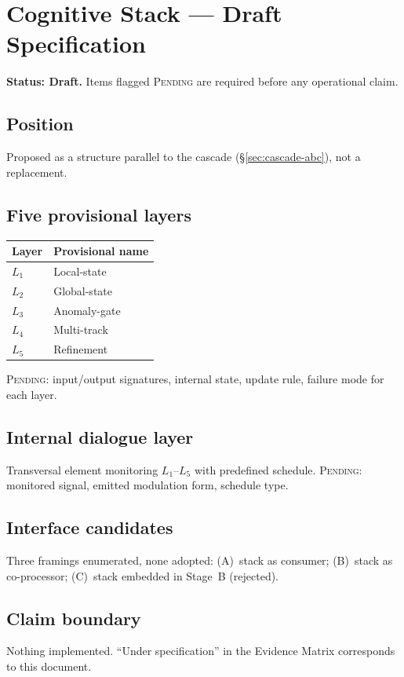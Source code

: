 \section{Cognitive Stack --- Draft Specification}
\label{sec:cognitive-stack-draft}

\noindent\textbf{Status: Draft.} Items flagged \textsc{Pending} are required
before any operational claim.

\subsection{Position}

Proposed as a structure parallel to the cascade
(\S\ref{sec:cascade-abc}), not a replacement.

\subsection{Five provisional layers}

\begin{tabular}{ll}
\toprule
Layer & Provisional name \\
\midrule
$L_1$ & Local-state \\
$L_2$ & Global-state \\
$L_3$ & Anomaly-gate \\
$L_4$ & Multi-track \\
$L_5$ & Refinement \\
\bottomrule
\end{tabular}

\textsc{Pending}: input/output signatures, internal state, update rule,
failure mode for each layer.

\subsection{Internal dialogue layer}

Transversal element monitoring $L_1$--$L_5$ with predefined schedule.
\textsc{Pending}: monitored signal, emitted modulation form, schedule type.

\subsection{Interface candidates}

Three framings enumerated, none adopted: (A)~stack as consumer;
(B)~stack as co-processor; (C)~stack embedded in Stage~B (rejected).

\subsection{Claim boundary}

Nothing implemented. ``Under specification'' in the Evidence Matrix
corresponds to this document.
